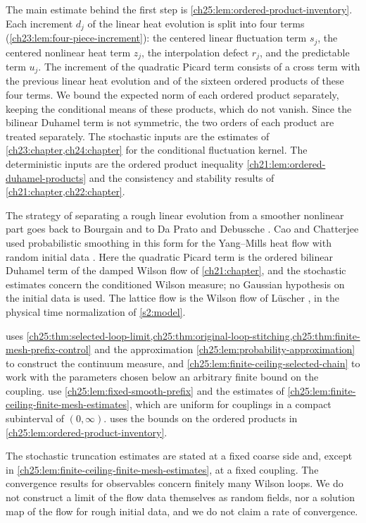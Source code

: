 The main estimate behind the first step is \cref{ch25:lem:ordered-product-inventory}. Each increment $d_j$ of the linear heat evolution is split into four terms (\cref{ch23:lem:four-piece-increment}): the centered linear fluctuation term $s_j$, the centered nonlinear heat term $z_j$, the interpolation defect $r_j$, and the predictable term $u_j$. The increment of the quadratic Picard term consists of a cross term with the previous linear heat evolution and of the sixteen ordered products of these four terms. We bound the expected norm of each ordered product separately, keeping the conditional means of these products, which do not vanish. Since the bilinear Duhamel term is not symmetric, the two orders of each product are treated separately. The stochastic inputs are the estimates of \cref{ch23:chapter,ch24:chapter} for the conditional fluctuation kernel. The deterministic inputs are the ordered product inequality \cref{ch21:lem:ordered-duhamel-products} and the consistency and stability results of \cref{ch21:chapter,ch22:chapter}.

The strategy of separating a rough linear evolution from a smoother nonlinear part goes back to Bourgain \cite{Bourgain1996} and to Da Prato and Debussche \cite{DaPratoDebussche2003}. Cao and Chatterjee used probabilistic smoothing in this form for the Yang--Mills heat flow with random initial data \cite[Section~1.1]{CCHeat2022v4}. Here the quadratic Picard term is the ordered bilinear Duhamel term of the damped Wilson flow of \cref{ch21:chapter}, and the stochastic estimates concern the conditioned Wilson measure; no Gaussian hypothesis on the initial data is used. The lattice flow is the Wilson flow of L\"uscher \cite{Luscher2010WilsonFlow}, in the physical time normalization of \cref{s2:model}.

 uses \cref{ch25:thm:selected-loop-limit,ch25:thm:original-loop-stitching,ch25:thm:finite-mesh-prefix-control} and the approximation \cref{ch25:lem:probability-approximation} to construct the continuum measure, and \cref{ch25:lem:finite-ceiling-selected-chain} to work with the parameters chosen below an arbitrary finite bound on the coupling.  use \cref{ch25:lem:fixed-smooth-prefix} and the estimates of \cref{ch25:lem:finite-ceiling-finite-mesh-estimates}, which are uniform for couplings in a compact subinterval of $(0,\infty)$.  uses the bounds on the ordered products in \cref{ch25:lem:ordered-product-inventory}.

The stochastic truncation estimates are stated at a fixed coarse side and, except in \cref{ch25:lem:finite-ceiling-finite-mesh-estimates}, at a fixed coupling. The convergence results for observables concern finitely many Wilson loops. We do not construct a limit of the flow data themselves as random fields, nor a solution map of the flow for rough initial data, and we do not claim a rate of convergence.

